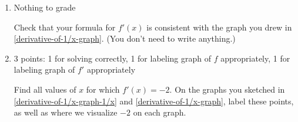 \documentclass{article}
\providecommand{\check}{}
\renewcommand{\check}{\ifmmode{\text{ \ding{51} }}\else{\ding{51} }\fi}
\begin{document}
\begin{enumerate}
\begin{enumerate}
    \begin{solution}  
      \begin{align*}
        f'(x) &= \displaystyle \lim_{h \rightarrow 0} \frac{ f(x+h) - f(x) }{h} \\
        &= \displaystyle \lim_{h \rightarrow 0} \frac{ \frac{1}{x+h} - \frac{1}{x} } {h} \\
        &= \displaystyle \lim_{h \rightarrow 0} \frac{ \frac{ x - (x+h)}{x(x+h)}}{h}\\
        &= \displaystyle \lim_{h \rightarrow 0}  \frac{-h}{x(x+h)} \cdot \frac{ 1 } {h} \\
        &= \displaystyle \lim_{h \rightarrow 0}\frac{ -1}{x(x+h)} \\
        & =\boxed{ -\frac{1}{x^2}}\\
      \end{align*}
    \end{solution}

  \item

    \begin{grading}
      Nothing to grade
    \end{grading}

    \begin{problem}
      \check Check that your formula for $f'(x)$ is consistent with the graph you drew in \ref{derivative-of-1/x-graph}. (You don't need to write anything.)
    \end{problem}

  \item
    \begin{grading} 
      3 points: 1 for solving correctly, 1 for labeling graph of $f$ appropriately, 1 for labeling graph of $f'$ appropriately 
    \end{grading} 

    \begin{problem}[\stretch{0.5}]
      Find all values of $x$ for which $f'(x) = -2$. On the graphs you sketched in \ref{derivative-of-1/x-graph-1/x} and \ref{derivative-of-1/x-graph}, label these points, as well as where we visualize $-2$ on each graph.
    \end{problem}


\end{enumerate}
\end{enumerate}
\end{document}
